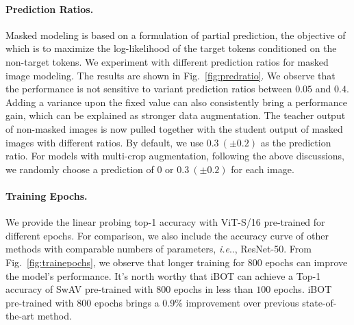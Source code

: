 \documentclass{article} %
\makeatletter
\def\ourmethod{{iBOT}\xspace}
\DeclareRobustCommand\onedot{\futurelet\@let@token\@onedot}
\def\@onedot{\ifx\@let@token.\else.\null\fi\xspace}
\def\ie{\emph{i.e}\onedot} \def\Ie{\emph{I.e}\onedot}
\makeatother
\begin{document}
\paragraph{Prediction Ratios.}
Masked modeling is based on a formulation of partial prediction, the objective of which is to maximize the log-likelihood of the target tokens conditioned on the non-target tokens. We experiment with different prediction ratios for masked image modeling. The results are shown in Fig.~\ref{fig:predratio}. We observe that the performance is not sensitive to variant prediction ratios between $0.05$ and $0.4$. Adding a variance upon the fixed value can also consistently bring a performance gain, which can be explained as stronger data augmentation. The teacher output of non-masked images is now pulled together with the student output of masked images with different ratios. By default, we use $0.3 \ (\pm 0.2)$ as the prediction ratio. For models with multi-crop augmentation, following the above discussions, we randomly choose a prediction of $0$ or $0.3 \ (\pm 0.2)$ for each image.

\paragraph{Training Epochs.} 
We provide the linear probing top-1 accuracy with ViT-S/16 pre-trained for different epochs. For comparison, we also include the accuracy curve of other methods with comparable numbers of parameters, \ie, ResNet-50. From Fig.~\ref{fig:trainepochs}, we observe that longer training for $800$ epochs can improve the model's performance. It's north worthy that \ourmethod can achieve a Top-1 accuracy of SwAV \citep{swav} pre-trained with $800$ epochs in less than $100$ epochs. \ourmethod pre-trained with $800$ epochs brings a 0.9\% improvement over previous state-of-the-art method.
\end{document}
